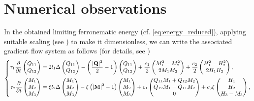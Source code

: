 \documentclass{article}
\newtheorem{remark}[theorem]{Remark}
\def\Qvec{\mathbf{Q}}
\def \Mvec{\mathbf{M}}
\begin{document}
\section{Numerical observations}\label{sec:numerical observations}
In the obtained limiting ferronematic energy (cf. \eqref{eq:energy_reduced}), applying suitable scaling (see  \cite{dutta2025study}) to make it dimensionless, we can write the associated gradient flow system as follows (for details, see \cite{dutta2026existence})
\begin{eqnarray}
\small
\left\{ \begin{aligned}
\tau_1\frac{\partial}{\partial t}\begin{pmatrix}
Q_{11}\\
Q_{12}
\end{pmatrix} &=2l_1\Delta \begin{pmatrix}
Q_{11}\\
Q_{12}
\end{pmatrix} - \left(\frac{|\Qvec|^2}{2} - 1\right)\begin{pmatrix}
Q_{11}\\
Q_{12}
\end{pmatrix} + \frac{c_1}{2}\begin{pmatrix}
M_1^2 - M_2^2\\
2M_1M_2
\end{pmatrix}+ \frac{c_2}{2}\begin{pmatrix}
H_1^2 - H_2^2\\
2H_1H_2
\end{pmatrix},\\
\tau_2\frac{\partial}{\partial t}\begin{pmatrix}
M_1\\
M_2\\
M_3
\end{pmatrix}&= \xi l_2\Delta \begin{pmatrix}
M_1\\
M_2\\
M_3
\end{pmatrix} - \xi\left(|\Mvec|^2-1\right)\begin{pmatrix}
M_1\\
M_2\\
M_3
\end{pmatrix} + c_1\begin{pmatrix}
Q_{11}M_1 + Q_{12}M_2\\
Q_{12}M_1 - Q_{11}M_2\\
0
\end{pmatrix}
+ c_3\xi\begin{pmatrix}
H_1\\
H_2\\
H_3-M_3
\end{pmatrix},
\end{aligned}\right.\nonumber\\ \label{eq:26}
\end{eqnarray}
\end{document}

